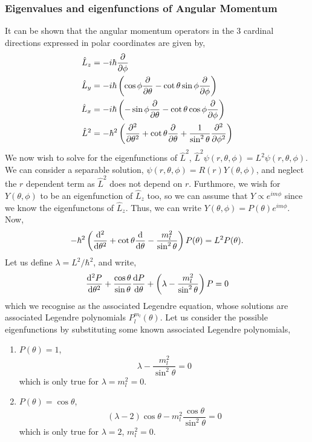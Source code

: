 \documentclass{book}
\begin{document}
\subsubsection{Eigenvalues and eigenfunctions of Angular Momentum}
It can be shown that the angular momentum operators in the 3 cardinal directions expressed in polar coordinates are given by,
\begin{align}
	\hat{L}_z & = -i\hbar \pdv{\phi} \\
	\hat{L}_y & = -i\hbar \left(\cos\phi \pdv{\theta} -\cot\theta \sin\phi \pdv{\phi}\right) \\
	\hat{L}_x & = -i\hbar \left(-\sin\phi \pdv{\theta} - \cot\theta \cos\phi \pdv{\phi}\right) \\
	\hat{L}^2 & = -\hbar^2\left(\pdv[2]{\theta} + \cot\theta\pdv{\theta} + \frac{1}{\sin^2\theta}\pdv[2]{\phi}\right)
\end{align}
We now wish to solve for the eigenfunctions of $\hat{L}^2$, $\hat{L}^2\psi(r,\theta,\phi) = L^2\psi(r,\theta,\phi)$. We can consider a separable solution, $\psi(r,\theta,\phi) = R(r)Y(\theta,\phi)$, and neglect the $r$ dependent term as $\hat{L}^2$ does not depend on $r$. Furthmore, we wish for $Y(\theta,\phi)$ to be an eigenfunction of $\hat{L}_z$ too, so we can assume that $Y \propto e^{im\phi}$ since we know the eigenfunctons of $\hat{L}_z$. Thus, we can write $Y(\theta,\phi) = P(\theta)e^{im\phi}$. Now,
\begin{equation}
	-\hbar^2\left(\dv[2]{\theta} + \cot\theta\dv{\theta} -\frac{m_l^2}{\sin^2\theta}\right)P(\theta) = L^2P(\theta).
\end{equation}
Let us define $\lambda = L^2/\hbar^2$, and write,
\begin{equation}
	\dv[2]{P}{\theta} + \frac{\cos\theta}{\sin\theta}\dv{P}{\theta} + \left(\lambda - \frac{m_l^2}{\sin^2\theta}\right)P = 0
\end{equation}
which we recognise as the associated Legendre equation, whose solutions are associated Legendre polynomials $P_l^{m_l}(\theta)$. Let us consider the possible eigenfunctions by substituting some known associated Legendre polynomials,
\begin{enumerate}
	\item $P(\theta) = 1$,
	\begin{equation}
		\lambda - \frac{m_l^2}{\sin^2\theta} = 0
	\end{equation}
	which is only true for $\lambda = m_l^2 = 0$.
	\item $P(\theta) = \cos\theta$,
	\begin{equation}
		(\lambda - 2)\cos\theta - m_l^2\frac{\cos\theta}{\sin^2\theta} = 0
	\end{equation}
	which is only true for $\lambda = 2$, $m_l^2=0$.
\end{enumerate}
\end{document}
